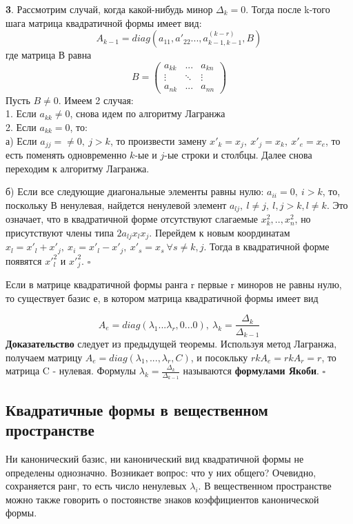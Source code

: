 \textbf{3}. Рассмотрим случай, когда какой-нибудь минор $\Delta_k=0$. 
Тогда после k-того шага матрица квадратичной формы имеет вид:
$$A_{k-1}=diag(a_{11},a'_{22}...,a_{k-1,k-1}^{(k-r)},\boxed{B})$$
где матрица В равна 
$$B=\begin{pmatrix}a_{kk}&...&a_{kn}\\\vdots&\ddots&\vdots\\a_{nk}&...&a_{nn}
\end{pmatrix}$$
Пусть $B\ne0$. Имеем 2 случая:\\
1. Если $a_{kk}\ne0$, снова идем по алгоритму Лагранжа\\
2. Если $a_{kk}=0$, то:\\
 
а) Если $a_{jj}=\ne0,~j>k$, то произвести замену
$x'_k=x_j,~x'_j=x_k,~x'_e=x_e$, то есть поменять одновременно $k$-ые и $j$-ые 
строки и столбцы. Далее снова переходим к алгоритму Лагранжа.
 
 б) Если все следующие диагональные элементы равны нулю: $a_{ii}=0,~i>k$, то,
 поскольку В ненулевая, найдется ненулевой элемент $a_{lj},~l\ne j,~l,j>k,l\ne
 k$. Это означает, что в квадратичной форме отсутствуют слагаемые $x^2_k,.
 .,x^2_n$, но присутствуют члены типа $2a_{lj}x_lx_j$. Перейдем к новым 
 координатам $x_l=x'_l+x'_j,~x_i=x'_l-x'_j,~x'_s=x_s~\forall s\ne k,j$. Тогда 
 в квадратичной форме появятся $x'^2_l$ и $x'^2_j$. $\square$
 


 \begin{theor}
 Если в матрице квадратичной формы ранга r первые r миноров не равны нулю, то 
 существует базис е, в котором матрица квадратичной формы имеет вид
 \end{theor}
 $$A_e=diag(\lambda_1...\lambda_r,0...0),~\lambda_k=\frac{\Delta_k}
 {\Delta_{k-1}}$$
 \textbf{Доказательство} следует из предыдущей теоремы. Используя метод 
 Лагранжа, получаем матрицу $A_e=diag(\lambda_1,...,\lambda_r,\boxed{C})$, и 
 посокльку $rkA_e=rkA_r=r$, то матрица C - нулевая. Формулы $\lambda_k=
 \frac{\Delta_k}{\Delta_{k-1}}$ называются \textbf{формулами Якоби}. $\square$ 
 
 \subsection{Квадратичные формы в вещественном пространстве}
 Ни канонический базис, ни канонический вид квадратичной формы не определены
 однозначно. Возникает вопрос: что у них общего? Очевидно, сохраняется ранг,
 то есть число ненулевых $\lambda_i$. В вещественном пространстве можно также 
 говорить о постоянстве знаков коэффициентов канонической формы. 
 
